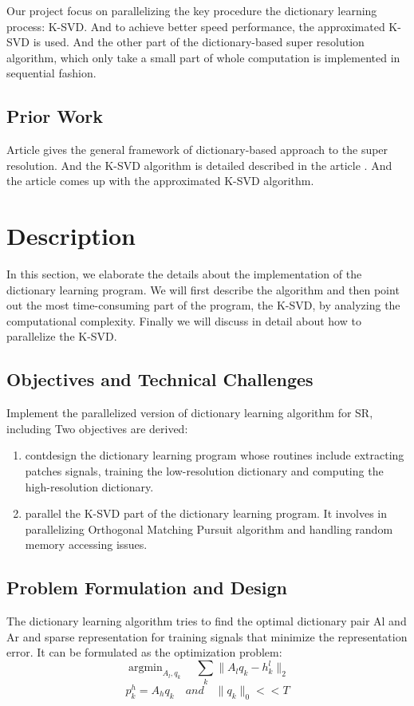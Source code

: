 \documentclass[english]{cccconf}
\begin{document}
Our project focus on parallelizing the key procedure the dictionary learning process: K-SVD. And to achieve better speed performance, the approximated K-SVD\parencite{rubinstein_efficient_2009} is used. And the other part of the dictionary-based super resolution algorithm, which only take a small part of whole computation is implemented in sequential fashion. 

\subsection{Prior Work}
Article \cite{jianchao_yang_image_2010} gives the general framework of dictionary-based approach to the super resolution. And the K-SVD algorithm is detailed described in the article \cite{aharon_rm_2006}. And the article \cite{rubinstein_efficient_2009} comes up with the approximated K-SVD algorithm.


\section{Description}
In this section, we elaborate the details about the implementation of the dictionary learning program. We will first describe the algorithm and then point out the most time-consuming part of the program, the K-SVD, by analyzing the computational complexity. Finally we will discuss in detail about how to parallelize the K-SVD. 
\subsection{Objectives and Technical Challenges}
Implement the parallelized version of dictionary learning algorithm for SR, including 
Two objectives are derived:
\begin{enumerate}
	\item contdesign the dictionary learning program whose routines include extracting patches signals, training the low-resolution dictionary and computing the high-resolution dictionary.
	
	\item parallel the K-SVD part of the dictionary learning program. It involves in parallelizing Orthogonal Matching Pursuit algorithm and handling random memory accessing issues.
\end{enumerate}
 
\subsection{Problem Formulation and Design }
The dictionary learning algorithm tries to find the optimal dictionary pair Al and Ar and sparse representation for training signals that minimize the representation error. It can be formulated as the optimization problem:  
\begin{equation}
	\mathop{\mathrm{argmin}}_{A_l,q_k}\quad\sum_k\big\lVert A_lq_k - h_k^l \big\rVert_2
	\label{equ2}
\end{equation}
\begin{equation}
p_k^h = A_hq_k\quad and \quad \lVert q_k \rVert_0 <<T
\label{equ3}
\end{equation}
\end{document}
